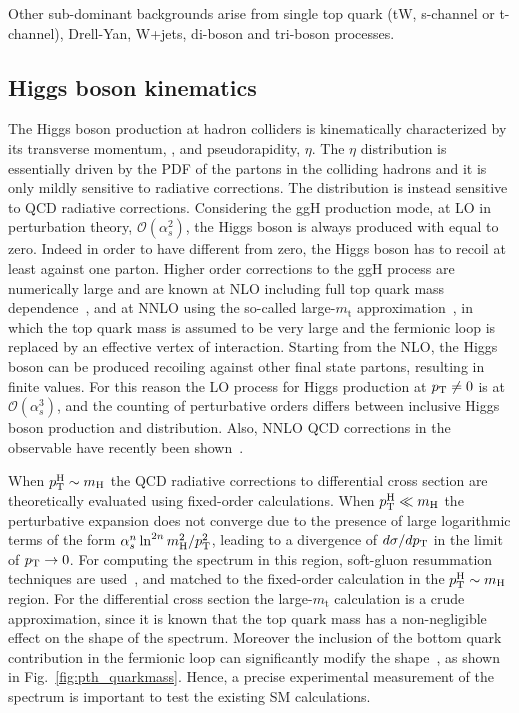 Other sub-dominant backgrounds arise from single top quark (tW, s-channel or t-channel), Drell-Yan, W+jets, di-boson and tri-boson processes.


\subsection{Higgs boson kinematics}

The Higgs boson production at hadron colliders is kinematically characterized by its transverse momentum, \pth, and pseudorapidity, $\eta$. The $\eta$ distribution is essentially driven by the PDF of the partons in the colliding hadrons and it is only mildly sensitive to radiative corrections. The \pth distribution is instead sensitive to QCD radiative corrections. 
Considering the ggH production mode, at LO in perturbation theory, $\mathcal{O}(\alpha_s^2)$, the Higgs boson is always produced with \pth equal to zero. Indeed in order to have \pt different from zero, the Higgs boson has to recoil at least against one parton. Higher order corrections to the ggH process are numerically large and are known at NLO including full top quark mass dependence~\cite{Spira:1995rr,Harlander:2005rq}, and at NNLO using the so-called large-$m_\mathrm{t}$ approximation~\cite{Ravindran:2003um,Catani:2007vq,Anastasiou:2015ema}, in which the top quark mass is assumed to be very large and the fermionic loop is replaced by an effective vertex of interaction. Starting from the NLO, the Higgs boson can be produced recoiling against other final state partons, resulting in finite \pth values. For this reason the LO process for Higgs production at $p_\mathrm{T} \neq 0$ is at $\mathcal{O}(\alpha_s^3)$, and the counting of perturbative orders differs between inclusive Higgs boson production and \pth distribution. Also, NNLO QCD corrections in the \pth observable have recently been shown~\cite{Chen:2016zka}.

When $p_\mathrm{T}^\mathrm{H} \sim m_\mathrm{H}$ the QCD radiative corrections to \pth differential cross section are theoretically evaluated using fixed-order calculations. When $p_\mathrm{T}^\mathrm{H} \ll m_\mathrm{H}$ the perturbative expansion does not converge due to the presence of large logarithmic terms of the form $\alpha_s^n \ln^{2n}m_\mathrm{H}^2/p_\mathrm{T}^2$, leading to a divergence of $d\sigma/dp_\mathrm{T}$ in the limit of $p_\mathrm{T}\to0$. For computing the \pth spectrum in this region, soft-gluon resummation techniques are used~\cite{Bozzi:2005wk,deFlorian:2012mx}, and matched to the fixed-order calculation in the $p_\mathrm{T}^\mathrm{H} \sim m_\mathrm{H}$ region.
For the \pth differential cross section the large-$m_\mathrm{t}$ calculation is a crude approximation, since it is known that the top quark mass has a non-negligible effect on the shape of the spectrum. Moreover the inclusion of the bottom quark contribution in the fermionic loop can significantly modify the \pth shape~\cite{Grazzini:2013mca}, as shown in Fig.~\ref{fig:pth_quarkmass}. Hence, a precise experimental measurement of the \pth spectrum is important to test the existing SM calculations. 

